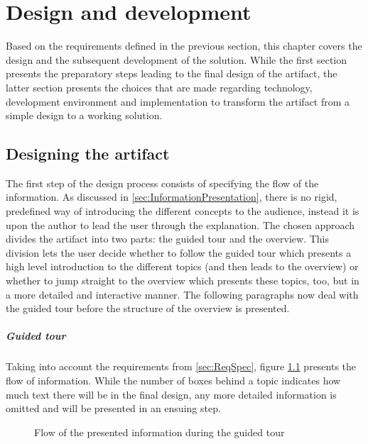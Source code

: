 \chapter{Design and development}
Based on the requirements defined in the previous section, this chapter covers the design and the subsequent development of the solution. While the first section presents the preparatory steps leading to the final design of the artifact, the latter section presents the choices that are made regarding technology, development environment and implementation to transform the artifact from a simple design to a working solution.

\section{Designing the artifact} \label{sec:ArtifactDesign}
The first step of the design process consists of specifying the flow of the information. As discussed in \ref{sec:InformationPresentation}, there is no rigid, predefined way of introducing the different concepts to the audience, instead it is upon the author to lead the user through the explanation. The chosen approach divides the artifact into two parts: the guided tour and the overview. This division lets the user decide whether to follow the guided tour which presents a high level introduction to the different topics (and then leads to the overview) or whether to jump straight to the overview which presents these topics, too, but in a more detailed and interactive manner. The following paragraphs now deal with the guided tour before the structure of the overview is presented.

\paragraph{Guided tour} Taking into account the requirements from \ref{sec:ReqSpec}, figure \ref{fig:DesignConcept} presents the flow of information. %
While the number of boxes behind a topic indicates how much text there will be in the final design, any more detailed information is omitted and will be presented in an ensuing step. 

\begin{figure}
    \centering
    
    \caption{Flow of the presented information during the guided tour}
    \label{fig:DesignConcept}
\end{figure}

